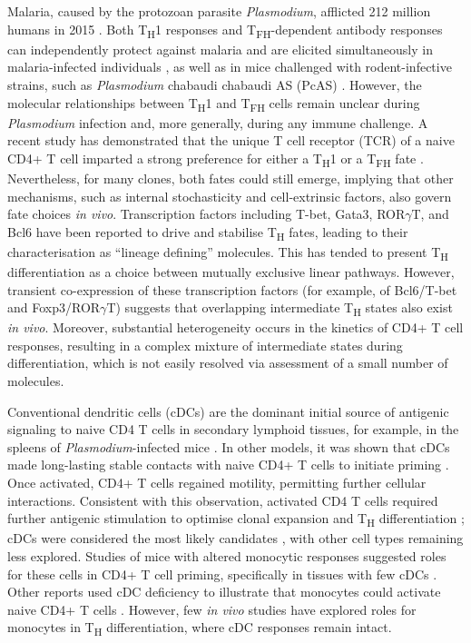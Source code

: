 Malaria, caused by the protozoan parasite \textit{Plasmodium}, afflicted 212 million humans in 2015 \cite{Organization2016-tj}. Both T\textsubscript{H}1 responses \cite{Pinzon-Charry2010-zk} and T\textsubscript{FH}-dependent antibody responses \cite{Boyle2015-yg} can independently protect against malaria and are elicited simultaneously in malaria-infected individuals \cite{Obeng-Adjei2015-dc}, as well as in mice challenged with rodent-infective strains, such as \textit{Plasmodium} chabaudi chabaudi AS (PcAS) \cite{Perez-Mazliah2014-cq}. However, the molecular relationships between T\textsubscript{H}1 and T\textsubscript{FH} cells remain unclear during \textit{Plasmodium} infection and, more generally, during any immune challenge. A recent study has demonstrated that the unique T cell receptor (TCR) of a naive CD4+ T cell imparted a strong preference for either a T\textsubscript{H}1 or a T\textsubscript{FH} fate \cite{Tubo2013-zg}. Nevertheless, for many clones, both fates could still emerge, implying that other mechanisms, such as internal stochasticity and cell-extrinsic factors, also govern fate choices \textit{in vivo}. Transcription factors including T-bet, Gata3, ROR\( \gamma \)T, and Bcl6 have been reported to drive and stabilise T\textsubscript{H} fates, leading to their characterisation as “lineage defining” molecules. This has tended to present T\textsubscript{H} differentiation as a choice between mutually exclusive linear pathways. However, transient co-expression of these transcription factors (for example, of Bcl6/T-bet and Foxp3/ROR\( \gamma \)T) suggests that overlapping intermediate T\textsubscript{H} states also exist \textit{in vivo}. Moreover, substantial heterogeneity occurs in the kinetics of CD4+ T cell responses, resulting in a complex mixture of intermediate states during differentiation, which is not easily resolved via assessment of a small number of molecules.

Conventional dendritic cells (cDCs) are the dominant initial source of antigenic signaling to naive CD4 T cells in secondary lymphoid tissues, for example, in the spleens of \textit{Plasmodium}-infected mice \cite{DeWalick2007-mu}. In other models, it was shown that cDCs made long-lasting stable contacts with naive CD4+ T cells to initiate priming \cite{Celli2007-dp}. Once activated, CD4+ T cells regained motility, permitting further cellular interactions. Consistent with this observation, activated CD4 T cells required further antigenic stimulation to optimise clonal expansion and T\textsubscript{H} differentiation \cite{Bajenoff2002-om}; cDCs were considered the most likely candidates \cite{Celli2007-dp, Groom2012-az}, with other cell types remaining less explored. Studies of mice with altered monocytic responses suggested roles for these cells in CD4+ T cell priming, specifically in tissues with few cDCs \cite{Hohl2009-wg}. Other reports used cDC deficiency to illustrate that monocytes could activate naive CD4+ T cells \cite{Nakano2009-rg}. However, few \textit{in vivo} studies have explored roles for monocytes in T\textsubscript{H} differentiation, where cDC responses remain intact.

